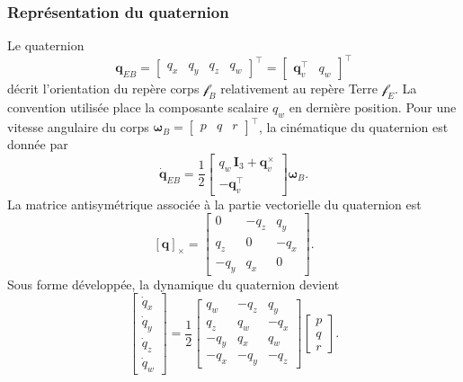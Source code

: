 \documentclass[11pt,a4paper,oneside]{report}
\newcommand{\vect}[1]{\bm{#1}}
\newcommand{\crossmat}[1]{\left[#1\right]_{\times}}
\begin{document}
	\subsubsection{Représentation du quaternion}
	Le quaternion
	\begin{equation}
		\mathbf{q}_{EB}
		=
		\begin{bmatrix}
			q_x & q_y & q_z & q_w
		\end{bmatrix}^{\top}
		=
		\begin{bmatrix}
			\mathbf{q}_v^{\top} & q_w
		\end{bmatrix}^{\top}
	\end{equation}
	décrit l'orientation du repère corps \(\mathcal{f}_B\) relativement au repère Terre \(\mathcal{f}_E\). La convention utilisée place la composante scalaire \(q_w\) en dernière position. Pour une vitesse angulaire du corps
	\(\boldsymbol{\omega}_B=\begin{bmatrix}p&q&r\end{bmatrix}^{\top}\), la cinématique du quaternion est donnée par
	\begin{equation}
		\dot{\mathbf{q}}_{EB}
		=
		\frac{1}{2}
		\begin{bmatrix}
			q_w\,\mathbf{I}_3+\mathbf{q}_v^{\times}\\
			-\mathbf{q}_v^{\top}
		\end{bmatrix}
		\boldsymbol{\omega}_B.
		\label{eq_quaternion_kinematics_compact}
	\end{equation}
	La matrice antisymétrique associée à la partie vectorielle du quaternion est
	\begin{equation}
		\crossmat{\vect q}
		=
		\begin{bmatrix}
			0 & -q_z & q_y\\
			q_z & 0 & -q_x\\
			-q_y & q_x & 0
		\end{bmatrix}.
		\label{eq_quaternion_vector_skew}
	\end{equation}
	Sous forme développée, la dynamique du quaternion devient
	\begin{equation}
		\begin{bmatrix}
			\dot{q}_x\\
			\dot{q}_y\\
			\dot{q}_z\\
			\dot{q}_w
		\end{bmatrix}
		=
		\frac{1}{2}
		\begin{bmatrix}
			q_w & -q_z & q_y\\
			q_z & q_w & -q_x\\
			-q_y & q_x & q_w\\
			-q_x & -q_y & -q_z
		\end{bmatrix}
		\begin{bmatrix}
			p\\
			q\\
			r
		\end{bmatrix}.
		\label{eq_quaternion_kinematics}
	\end{equation}
\end{document}
